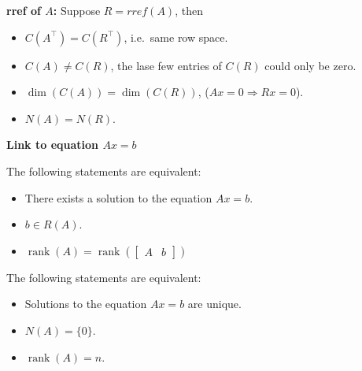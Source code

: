 \documentclass[14pt]{article}
\theoremstyle{definition}
\theoremstyle{remark}
\begin{document}
\begin{multicols}{2}
    \textbf{rref of $A$:} Suppose $R= rref(A)$, then
    \begin{itemize}
        \item $C(A^\top) = C(R^\top)$, i.e.\ same row space.
        \item $C(A) \ne C(R)$, the lase few entries of $C(R)$ could only be zero.
        \item $\operatorname{\dim}(C(A)) = \operatorname{\dim}(C(R))$, ($Ax= 0 \Longrightarrow Rx = 0$).
        \item $N(A) = N(R)$.
    \end{itemize}

    \textbf{Link to equation $Ax=b$}

    The following statements are equivalent:
    \begin{itemize}
        \item There exists a solution to the equation $A x=b$.
        \item $b \in R(A)$.
        \item $\operatorname{rank}(A)=\operatorname{rank}\left(\left[\begin{array}{ll}A & b\end{array}\right]\right)$
    \end{itemize}

    The following statements are equivalent:
    \begin{itemize}
        \item Solutions to the equation $A x=b$ are unique.
        \item $N(A)=\{0\}$.
        \item $\operatorname{rank}(A)=n$.
    \end{itemize}
\end{multicols}

\headrule
\end{document}
